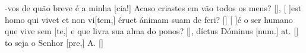 {  {-vos de quão breve é a minha [cia!] Acaso criastes em vão todos os mens? [\LinkPT]},
%
{[ ]{est} homo qui vivet et non vi[tem,] éruet ánimam suam de feri? [\LinkLA]}%
  {[ ]{é} o ser humano que vive sem [te,] e que livra sua alma do ponos? [\LinkPT]},
%
{díctus Dóminus [num.] at. [\LinkLA]}%
  {to seja o Senhor [pre,] A. [\LinkPT]}
}